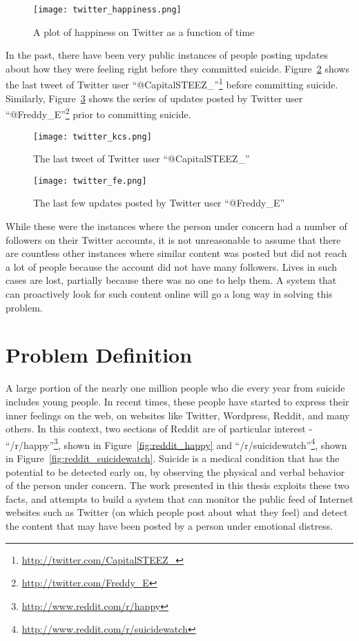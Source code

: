 \begin{figure}
    \centering
    \texttt{[image: twitter\_happiness.png]}
    \caption{A plot of happiness on Twitter as a function of time}
    \label{fig:twitter_happiness}
\end{figure}

In the past, there have been very public instances of people posting updates about how they were feeling right before they committed suicide. Figure~\ref{fig:twitter_kcs} shows the last tweet of Twitter user ``@CapitalSTEEZ\_''\footnote{\url{http://twitter.com/CapitalSTEEZ\_}} before committing suicide. Similarly, Figure~\ref{fig:twitter_fe} shows the series of updates posted by Twitter user ``@Freddy\_E''\footnote{\url{http://twitter.com/Freddy\_E}} prior to committing suicide.\\

\begin{figure}
    \centering
    \texttt{[image: twitter\_kcs.png]}
    \caption{The last tweet of Twitter user ``@CapitalSTEEZ\_''}
    \label{fig:twitter_kcs}
\end{figure}

\begin{figure}
    \centering
    \texttt{[image: twitter\_fe.png]}
    \caption{The last few updates posted by Twitter user ``@Freddy\_E''}
    \label{fig:twitter_fe}
\end{figure}

While these were the instances where the person under concern had a number of followers on their Twitter accounts, it is not unreasonable to assume that there are countless other instances where similar content was posted but did not reach a lot of people because the account did not have many followers. Lives in such cases are lost, partially because there was no one to help them. A system that can proactively look for such content online will go a long way in solving this problem.

\section{Problem Definition}
A large portion of the nearly one million people who die every year from suicide includes young people. In recent times, these people have started to express their inner feelings on the web, on websites like Twitter, Wordpress, Reddit, and many others. In this context, two sections of Reddit are of particular interest - ``/r/happy''\footnote{\url{http://www.reddit.com/r/happy}}, shown in Figure~\ref{fig:reddit_happy} and ``/r/suicidewatch''\footnote{\url{http://www.reddit.com/r/suicidewatch}}, shown in Figure~\ref{fig:reddit_suicidewatch}. Suicide is a medical condition that has the potential to be detected early on, by observing the physical and verbal behavior of the person under concern. The work presented in this thesis exploits these two facts, and attempts to build a system that can monitor the public feed of Internet websites such as Twitter (on which people post about what they feel) and detect the content that may have been posted by a person under emotional distress.\\

